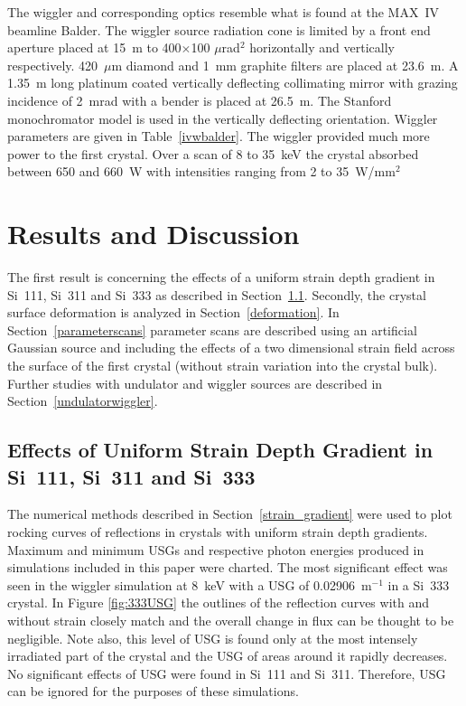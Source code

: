 \documentclass{iucr}
\begin{document}
The wiggler and corresponding optics resemble what is found at the MAX~IV beamline Balder. The wiggler source radiation cone is limited by a front end aperture placed at 15~m to 400$\times$100 $\mu$rad$^2$ horizontally and vertically respectively. 420~$\mu$m diamond and 1~mm graphite filters are placed at 23.6~m. A 1.35~m long platinum coated vertically deflecting collimating mirror with grazing incidence of 2~mrad with a bender is placed at 26.5~m. The Stanford monochromator model is used in the vertically deflecting orientation. Wiggler parameters are given in Table~\ref{ivwbalder}. The wiggler provided much more power to the first crystal. Over a scan of 8 to 35~keV the crystal absorbed between 650 and 660~W with intensities ranging from 2 to 35~W/mm$^2$

\section{Results and Discussion}

The first result is concerning the effects of a uniform strain depth gradient in Si~111, Si~311 and Si~333 as described in Section~\ref{strain_results}. Secondly, the crystal surface deformation is analyzed in Section~\ref{deformation}. In Section~\ref{parameterscans} parameter scans are described using an artificial Gaussian source and including the effects of a two dimensional strain field across the surface of the first crystal (without strain variation into the crystal bulk). Further studies with undulator and wiggler sources are described in Section~\ref{undulatorwiggler}.

\subsection{Effects of Uniform Strain Depth Gradient in Si~111, Si~311 and Si~333}\label{strain_results}
The numerical methods described in Section~\ref{strain_gradient} were used to plot rocking curves of reflections in crystals with uniform strain depth gradients. Maximum and minimum USGs and respective photon energies produced in simulations included in this paper were charted. The most significant effect was seen in the wiggler simulation at 8~keV with a USG of 0.02906~m$^{-1}$ in a Si~333 crystal. In Figure \ref{fig:333USG} the outlines of the reflection curves with and without strain closely match and the overall change in flux can be thought to be negligible. Note also, this level of USG is found only at the most intensely irradiated part of the crystal and the USG of areas around it rapidly decreases. No significant effects of USG were found in Si~111 and Si~311. Therefore, USG can be ignored for the purposes of these simulations.
\end{document}
